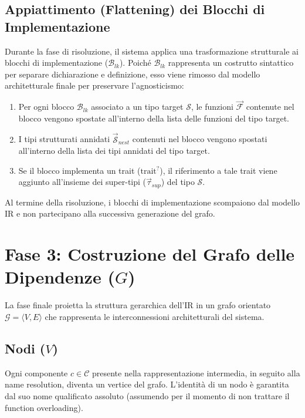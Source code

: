 \subsection{Appiattimento (Flattening) dei Blocchi di Implementazione}
Durante la fase di risoluzione, il sistema applica una trasformazione
strutturale ai blocchi di implementazione ($\mathcal{B}_{lk}$).
Poiché $\mathcal{B}_{lk}$ rappresenta un costrutto sintattico per
separare dichiarazione e definizione, esso viene rimosso dal modello
architetturale finale per preservare l'agnosticismo:
\begin{enumerate}
  \item Per ogni blocco $\mathcal{B}_{lk}$ associato a un tipo target
    $\mathcal{S}$, le funzioni $\vec{\mathcal{F}}$ contenute nel blocco vengono
    spostate all'interno della lista delle funzioni del tipo target.
  \item I tipi strutturati annidati $\vec{\mathcal{S}}_{nest}$
    contenuti nel blocco
    vengono spostati all'interno della lista dei tipi annidati del tipo target.
  \item Se il blocco implementa un trait ($\text{trait}^?$), il
    riferimento a tale trait viene aggiunto all'insieme dei
    super-tipi ($\vec{\tau}_{sup}$) del tipo $\mathcal{S}$.
\end{enumerate}
Al termine della risoluzione, i blocchi di implementazione scompaiono
dal modello IR e non partecipano alla successiva generazione del grafo.

\section{Fase 3: Costruzione del Grafo delle Dipendenze ($G$)}
La fase finale proietta la struttura gerarchica dell'IR in un grafo
orientato $\mathcal{G} = \langle V, E \rangle$ che rappresenta le
interconnessioni architetturali del sistema.

\subsection{Nodi ($V$)}
Ogni componente $c \in \mathcal{C}$ presente nella rappresentazione
intermedia, in seguito alla name resolution, diventa un vertice del
grafo. L'identità di un nodo è garantita dal suo nome qualificato
assoluto (assumendo per il momento di non trattare il function overloading).

